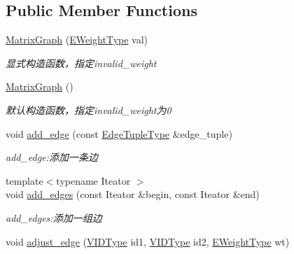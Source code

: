 \subsection*{Public Member Functions}
\begin{DoxyCompactItemize}
\item 
\hyperlink{struct_introdunction_to_algorithm_1_1_graph_algorithm_1_1_matrix_graph_a13dd6a7edd0776390b042302c56519cd}{Matrix\+Graph} (\hyperlink{struct_introdunction_to_algorithm_1_1_graph_algorithm_1_1_matrix_graph_af2d243f2c1bb8a101aa3f71f469c64e8}{E\+Weight\+Type} val)
\begin{DoxyCompactList}\small\item\em 显式构造函数，指定{\ttfamily invalid\+\_\+weight} \end{DoxyCompactList}\item 
\hyperlink{struct_introdunction_to_algorithm_1_1_graph_algorithm_1_1_matrix_graph_a46eaefb35a7150323befe5156b40c4e6}{Matrix\+Graph} ()
\begin{DoxyCompactList}\small\item\em 默认构造函数，指定{\ttfamily invalid\+\_\+weight}为0 \end{DoxyCompactList}\item 
void \hyperlink{struct_introdunction_to_algorithm_1_1_graph_algorithm_1_1_matrix_graph_aed3562e551c77ff7d80eae0e454d720e}{add\+\_\+edge} (const \hyperlink{struct_introdunction_to_algorithm_1_1_graph_algorithm_1_1_matrix_graph_a73af3fee951b91b4f5c48422460f8c03}{Edge\+Tuple\+Type} \&edge\+\_\+tuple)
\begin{DoxyCompactList}\small\item\em add\+\_\+edge\+:添加一条边 \end{DoxyCompactList}\item 
{\footnotesize template$<$typename Iteator $>$ }\\void \hyperlink{struct_introdunction_to_algorithm_1_1_graph_algorithm_1_1_matrix_graph_a7f2b13ccc3c080c736a703a7655dbcd0}{add\+\_\+edges} (const Iteator \&begin, const Iteator \&end)
\begin{DoxyCompactList}\small\item\em add\+\_\+edges\+:添加一组边 \end{DoxyCompactList}\item 
void \hyperlink{struct_introdunction_to_algorithm_1_1_graph_algorithm_1_1_matrix_graph_aa01c8df41f0948dd3116c9d6d8dd80d5}{adjust\+\_\+edge} (\hyperlink{struct_introdunction_to_algorithm_1_1_graph_algorithm_1_1_matrix_graph_ae00582b52cc9f015cb9b1b8f4d521776}{V\+I\+D\+Type} id1, \hyperlink{struct_introdunction_to_algorithm_1_1_graph_algorithm_1_1_matrix_graph_ae00582b52cc9f015cb9b1b8f4d521776}{V\+I\+D\+Type} id2, \hyperlink{struct_introdunction_to_algorithm_1_1_graph_algorithm_1_1_matrix_graph_af2d243f2c1bb8a101aa3f71f469c64e8}{E\+Weight\+Type} wt)

\end{DoxyCompactItemize}
